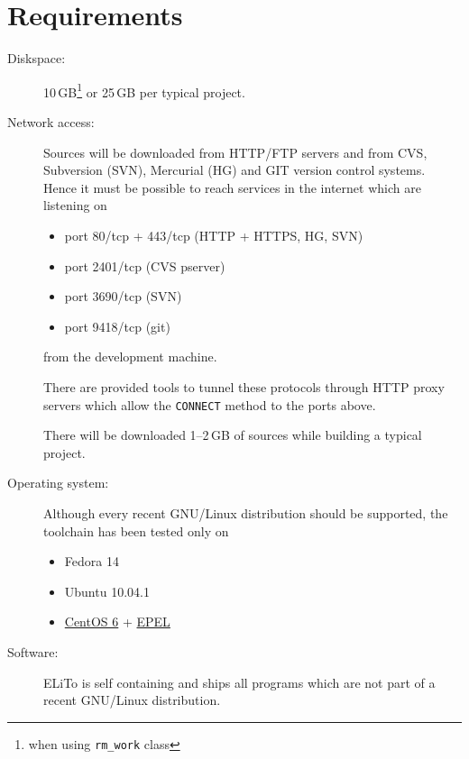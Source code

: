 \chapter{Requirements}
\label{chap:reqs}

\begin{description}
\item[Diskspace:] 10\,GB\footnote{when using \texttt{rm\_work} class}
  or 25\,GB per typical project.
\item[Network access:] Sources will be downloaded from HTTP/FTP
  servers and from CVS, Subversion (SVN), Mercurial (HG) and GIT
  version control systems. Hence it must be possible to reach services
  in the internet which are listening on
  \begin{itemize}
  \item port 80/tcp + 443/tcp  (HTTP + HTTPS, HG, SVN)
  \item port 2401/tcp (CVS pserver)
  \item port 3690/tcp (SVN)
  \item port 9418/tcp (git)
  \end{itemize}
  from the development machine.

  There are provided tools to tunnel these protocols through HTTP
  proxy servers which allow the \texttt{CONNECT} method to the ports
  above.

  There will be downloaded 1--2\,GB of sources while building a
  typical project.
\item[Operating system:] Although every recent GNU/Linux distribution
  should be supported, the toolchain has been tested only on
  \begin{itemize}
  \item Fedora 14
  \item Ubuntu 10.04.1
  \item \href{http://centos.org}{CentOS 6} +
    \href{https://fedoraproject.org/wiki/EPEL}{EPEL}
  \end{itemize}
\item[Software:] ELiTo is self containing and ships all programs which
  are not part of a recent GNU/Linux distribution.
\end{description}
